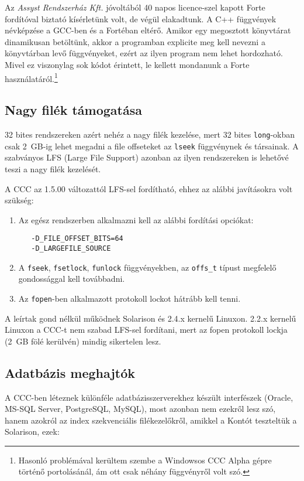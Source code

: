 Az \emph{Assyst Rendszerház Kft.} jóvoltából 40 napos licence-szel 
kapott Forte fordítóval biztató kísérletünk volt, de végül elakadtunk.
A C++ függvények névképzése a GCC-ben és a Fortéban eltérő. 
Amikor egy megosztott könyvtárat dinamikusan betöltünk, akkor a  programban
explicite meg kell nevezni a könyvtárban levő függvényeket, ezért az ilyen 
program nem lehet hordozható. Mivel ez viszonylag sok kódot érintett, 
le kellett mondanunk a Forte használatáról.\footnote{
Hasonló problémával kerültem szembe a Windowsos CCC Alpha gépre történő
portolásánál, ám ott csak néhány függvényről volt szó.}

\subsection{Nagy filék támogatása}

32 bites rendszereken azért nehéz a nagy filék kezelése, 
mert 32 bites \verb!long!-okban csak 2~GB-ig lehet megadni a file offseteket
az \verb!lseek! függvénynek és társainak. A szabványos LFS (Large File Support)
azonban az ilyen rendszereken is lehetővé teszi a nagy filék kezelését.

A CCC az 1.5.00 változattól LFS-sel fordítható, 
ehhez az alábbi javításokra volt szükség:

\begin{enumerate}
\item 
   Az egész rendszerben alkalmazni kell az alábbi fordítási opciókat:
   \begin{verbatim}
   -D_FILE_OFFSET_BITS=64
   -D_LARGEFILE_SOURCE
   \end{verbatim}
\item
   A \verb!fseek!, \verb!fsetlock!, \verb!funlock! függvényekben,
   az \verb!offs_t! típust megfelelő gondossággal kell továbbadni.
\item
   Az \verb!fopen!-ben alkalmazott protokoll lockot hátrább kell tenni.
\end{enumerate}

A leírtak gond nélkül működnek Solarison és 2.4.x kernelű Linuxon.
2.2.x kernelű Linuxon a CCC-t nem szabad LFS-sel fordítani, mert
az fopen protokoll lockja (2~GB fölé kerülvén) mindig sikertelen lesz.


\subsection{Adatbázis meghajtók}

A CCC-ben léteznek különféle adatbázisszerverekhez készült interfészek
(Oracle, MS-SQL Server, PostgreSQL, MySQL), most azonban nem ezekről
lesz szó, hanem azokról az index szekvenciális filékezelőkről,
amikkel a Kontót teszteltük a Solarison, ezek:

